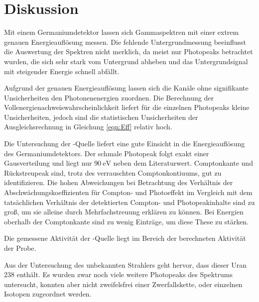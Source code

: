\section{Diskussion}

Mit einem Germaniumdetektor lassen sich Gammaspektren mit einer extrem genauen Energieauflösung messen.
Die fehlende Untergrundmessung beeinflusst die Auswertung der Spektren nicht merklich, da meist nur Photopeaks betrachtet wurden, die sich sehr stark vom Untergrund abheben und das Untergrundsignal mit steigender Energie schnell abfällt.

Aufgrund der genauen Energieauflösung lassen sich die Kanäle ohne signifikante Unsicherheiten den Photonenenergien zuordnen.
Die Berechnung der Vollenergienachweiswahrscheinlichkeit liefert für die einzelnen Photopeaks kleine Unsicherheiten, jedoch sind die statistischen Unsicherheiten der Ausgleichsrechnung in Gleichung \eqref{eqn:Eff} relativ hoch.

Die Untersuchung der -Quelle liefert eine gute Einsicht in die Energieauflösung des Germaniumdetektors.
Der schmale Photopeak folgt exakt einer Gausverteilung und liegt nur $\SI{90}{\electronvolt}$ neben dem Literaturwert.
Comptonkante und Rückstreupeak sind, trotz des verrauschten Comptonkontiuums, gut zu identifizieren.
Die hohen Abweichungen bei Betrachtung des Verhältnis der Abschwächungskoeffizienten für Compton- und Photoeffekt im Vergleich mit dem tatsächlichen Verhältnis der detektierten Compton- und Photopeakinhalte sind zu groß, um sie alleine durch Mehrfachstreuung erklären zu können. Bei Energien oberhalb der Comptonkante sind zu wenig Einträge, um diese These zu stärken.

Die gemessene Aktivität der -Quelle liegt im Bereich der berechneten Aktivität der Probe.

Aus der Untersuchung des unbekannten Strahlers geht hervor, dass dieser Uran 238 enthält. Es wurden zwar noch viele weitere Photopeaks des Spektrums untersucht, konnten aber nicht zweifelsfrei einer Zwerfallskette, oder einzelnen Isotopen zugeordnet werden.
